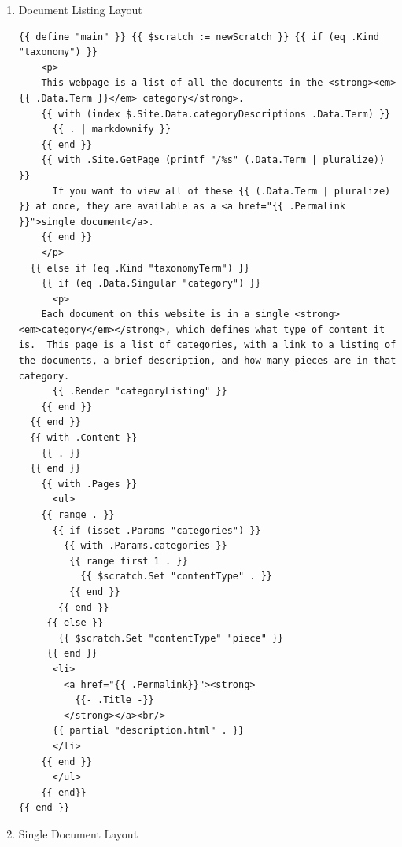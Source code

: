 \documentclass[11pt]{article}
\begin{document}
\begin{enumerate}
\begin{verbatim}
      <p>
	This website uses no cookies, collects no personal
	information, and conducts no tracking of its traffic:
	please <a href="mailto:emsenn@emsenn.net">send me an email</a>
	to let me know you visited.
      </p>
      <p>
	This document was created
	using <a href="https://www.gnu.org/software/emacs/">Emacs</a>,
	formatted with <a href="https://orgmode.org/">Org-mode</a>,
	converted to Markdown
	by <a href="https://ox-hugo.scripter.co/">Ox-Hugo</a>, built
	into HTML by <a href="https://gohugo.io/">Hugo</a>, and served
	by <a href="https://www.netlify.com/">Netlify</a>. I created
	this document's stylesheet, while the background patterns were
	created by <a href="http://www.heropatterns.com/">Steve
	Schoger</a>.
      </p>
      {{ end }}
    </footer>
  </body>
</html>
\end{verbatim}
\item Document Listing Layout
\label{sec:org7e2d582}
\begin{verbatim}
{{ define "main" }} {{ $scratch := newScratch }} {{ if (eq .Kind "taxonomy") }}
    <p>
    This webpage is a list of all the documents in the <strong><em>{{ .Data.Term }}</em> category</strong>.
    {{ with (index $.Site.Data.categoryDescriptions .Data.Term) }}
      {{ . | markdownify }}
    {{ end }}
    {{ with .Site.GetPage (printf "/%s" (.Data.Term | pluralize)) }}
      If you want to view all of these {{ (.Data.Term | pluralize) }} at once, they are available as a <a href="{{ .Permalink }}">single document</a>.
    {{ end }}
    </p>
  {{ else if (eq .Kind "taxonomyTerm") }}
    {{ if (eq .Data.Singular "category") }}
      <p>
	Each document on this website is in a single <strong><em>category</em></strong>, which defines what type of content it is.  This page is a list of categories, with a link to a listing of the documents, a brief description, and how many pieces are in that category.
      {{ .Render "categoryListing" }}
    {{ end }}
  {{ end }}
  {{ with .Content }}
    {{ . }}
  {{ end }}
    {{ with .Pages }}
      <ul>
	{{ range . }}
	  {{ if (isset .Params "categories") }}
	    {{ with .Params.categories }}
	     {{ range first 1 . }}
	       {{ $scratch.Set "contentType" . }}
	     {{ end }}
	   {{ end }}
	 {{ else }}
	   {{ $scratch.Set "contentType" "piece" }}
	 {{ end }}
	  <li>
	    <a href="{{ .Permalink}}"><strong>
	      {{- .Title -}}
	    </strong></a><br/>
	  {{ partial "description.html" . }}
	  </li>
	{{ end }}
      </ul>
    {{ end}}
{{ end }}
\end{verbatim}
\item Single Document Layout
\label{sec:org0919195}
\begin{verbatim}



\end{verbatim}
\end{enumerate}
\end{document}
